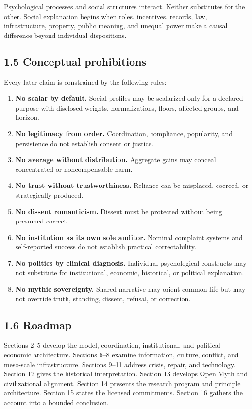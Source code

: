 \documentclass[
  11pt,
]{article}
\providecommand{\tightlist}{%
  \setlength{\itemsep}{0pt}\setlength{\parskip}{0pt}}
\begin{document}
Psychological processes and social structures interact. Neither
substitutes for the other. Social explanation begins when roles,
incentives, records, law, infrastructure, property, public meaning, and
unequal power make a causal difference beyond individual dispositions.

\subsection{1.5 Conceptual prohibitions}\label{conceptual-prohibitions}

Every later claim is constrained by the following rules:

\begin{enumerate}
\def\labelenumi{\arabic{enumi}.}
\tightlist
\item
  \textbf{No scalar by default.} Social profiles may be scalarized only
  for a declared purpose with disclosed weights, normalizations, floors,
  affected groups, and horizon.
\item
  \textbf{No legitimacy from order.} Coordination, compliance,
  popularity, and persistence do not establish consent or justice.
\item
  \textbf{No average without distribution.} Aggregate gains may conceal
  concentrated or noncompensable harm.
\item
  \textbf{No trust without trustworthiness.} Reliance can be misplaced,
  coerced, or strategically produced.
\item
  \textbf{No dissent romanticism.} Dissent must be protected without
  being presumed correct.
\item
  \textbf{No institution as its own sole auditor.} Nominal complaint
  systems and self-reported success do not establish practical
  correctability.
\item
  \textbf{No politics by clinical diagnosis.} Individual psychological
  constructs may not substitute for institutional, economic, historical,
  or political explanation.
\item
  \textbf{No mythic sovereignty.} Shared narrative may orient common
  life but may not override truth, standing, dissent, refusal, or
  correction.
\end{enumerate}

\subsection{1.6 Roadmap}\label{roadmap}

Sections 2--5 develop the model, coordination, institutional, and
political-economic architecture. Sections 6--8 examine information,
culture, conflict, and meso-scale infrastructure. Sections 9--11 address
crisis, repair, and technology. Section 12 gives the historical
interpretation. Section 13 develops Open Myth and civilizational
alignment. Section 14 presents the research program and principle
architecture. Section 15 states the licensed commitments. Section 16
gathers the account into a bounded conclusion.
\end{document}
